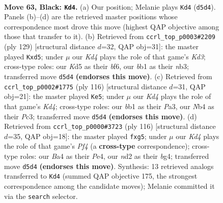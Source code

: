 \documentclass[11pt]{article}
\begin{document}
\clearpage

\begin{figure}[p]\centering
\begin{subfigure}{0.46\textwidth}\centering
\resizebox{\linewidth}{!}{%
\newchessgame
\chessboard[
  setfen={8/2r2p1p/6p1/3kP3/bn3Pp1/8/3N1K1P/1B6 b - - 17 63},
  showmover=false,
  pgfstyle=straightmove, color=movearrow, markmove={d5-d4}
]}
\caption{}
\end{subfigure}\hfill
\begin{subfigure}{0.46\textwidth}\centering
\resizebox{\linewidth}{!}{%
\newchessgame
\chessboard[
  setfen={8/8/3k1B2/3P2p1/1pn1p3/pN5P/4K3/8 b - - 5 65},
  showmover=false,
  pgfstyle=straightmove, color=movearrow, markmove={d6-d5}
]}
\caption{}
\end{subfigure}
\\[4pt]
\begin{subfigure}{0.46\textwidth}\centering
\resizebox{\linewidth}{!}{%
\newchessgame
\chessboard[
  setfen={3B4/1p3k2/2p5/5P2/p1pK4/P1P4b/1P6/8 w - - 23 59},
  showmover=false,
  pgfstyle=straightmove, color=movearrow, markmove={d4-e5}
]}
\caption{}
\end{subfigure}\hfill
\begin{subfigure}{0.46\textwidth}\centering
\resizebox{\linewidth}{!}{%
\newchessgame
\chessboard[
  setfen={8/1p3k2/3B4/p5pp/P3PPb1/1P4P1/8/2K5 w - - 0 59},
  showmover=false,
  pgfstyle=straightmove, color=movearrow, markmove={f4-g5}
]}
\caption{}
\end{subfigure}
\caption{\textbf{Move 63, Black: \texttt{Kd4}.} (a) Our position; Melanie plays \texttt{Kd4} (\texttt{d5d4}). Panels (b)--(d) are the retrieved master positions whose correspondence most drove this move (highest QAP objective among those that transfer to it). (b) Retrieved from \texttt{ccrl\_top\_p0003\#2209} (ply 129) [structural distance $d$=32, QAP obj=31]: the master played \texttt{Kxd5}; under $\mu$ our \emph{Kd4} plays the role of that game's \emph{Kd3}; cross-type roles: our \emph{K}d5 as their \emph{b}f6, our \emph{b}b1 as their \emph{n}b3; transferred move \texttt{d5d4} \textbf{(endorses this move)}. (c) Retrieved from \texttt{ccrl\_top\_p0002\#1775} (ply 116) [structural distance $d$=31, QAP obj=21]: the master played \texttt{Ke5}; under $\mu$ our \emph{Kd4} plays the role of that game's \emph{Kd4}; cross-type roles: our \emph{b}b1 as their \emph{P}a3, our \emph{N}b4 as their \emph{P}c3; transferred move \texttt{d5d4} \textbf{(endorses this move)}. (d) Retrieved from \texttt{ccrl\_top\_p0000\#3723} (ply 116) [structural distance $d$=35, QAP obj=18]: the master played \texttt{fxg5}; under $\mu$ our \emph{Kd4} plays the role of that game's \emph{Pf4} (a \textbf{cross-type} correspondence); cross-type roles: our \emph{B}a4 as their \emph{P}e4, our \emph{n}d2 as their \emph{b}g4; transferred move \texttt{d5d4} \textbf{(endorses this move)}. Synthesis: 13 retrieved analogs transferred to \texttt{Kd4} (summed QAP objective 175, the strongest correspondence among the candidate moves); Melanie committed it via the \texttt{search} selector.}
\label{fig:thought-m125}
\end{figure}
\end{document}
